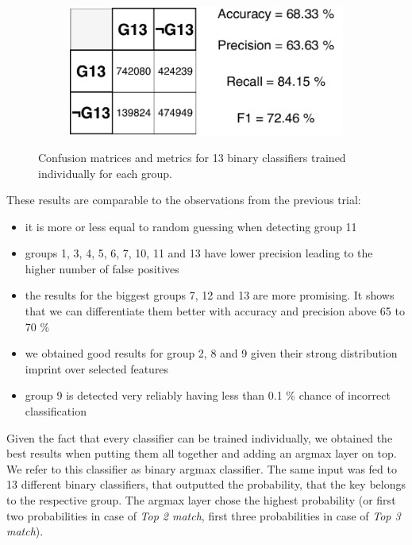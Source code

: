 \begin{figure}[H]
\vspace{3mm}
\begin{subfigure}{.33\textwidth}
  \centering
  \includegraphics[width=\textwidth]{tex/images/results/rese_g13_512}  
\end{subfigure}%

\caption{Confusion matrices and metrics for 13 binary classifiers trained individually for each group.}
\label{figure-binary-confusion-matrix}

\end{figure}

\noindent
These results are comparable to the observations from the previous trial:

\begin{itemize}

\item it is more or less equal to random guessing when detecting group 11
\item groups 1, 3, 4, 5, 6, 7, 10, 11 and 13 have lower precision leading to the higher number of false positives
\item the results for the biggest groups 7, 12 and 13 are more promising. It shows that we can differentiate them better with accuracy and precision above 65 to 70 \%
\item we obtained good results for group 2, 8 and 9 given their strong distribution imprint over selected features
\item group 9 is detected very reliably having less than 0.1 \% chance of incorrect classification

\end{itemize}

Given the fact that every classifier can be trained individually, we obtained the best results when putting them all together and adding an argmax layer on top. We refer to this classifier as binary argmax classifier. The same input was fed to 13 different binary classifiers, that outputted the probability, that the key belongs to the respective group. The argmax layer chose the highest probability (or first two probabilities in case of \textit{Top 2 match}, first three probabilities in case of \textit{Top 3 match}).


